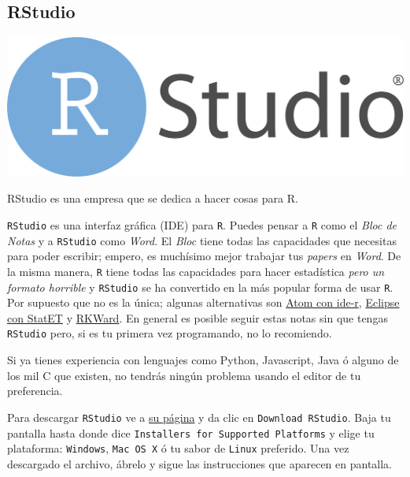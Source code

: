 \documentclass[]{tufte-book}
\begin{document}
\hypertarget{rstudio}{%
\subsection{RStudio}\label{rstudio}}

\begin{marginfigure}
\includegraphics[width=49.08in]{images/rstudio} \caption[RStudio es una empresa que se dedica a hacer cosas para R]{RStudio es una empresa que se dedica a hacer cosas para R.}\label{fig:unnamed-chunk-8}
\end{marginfigure}

\texttt{RStudio} es una interfaz gráfica (IDE) para \texttt{R}. Puedes
pensar a \texttt{R} como el \emph{Bloc de Notas} y a \texttt{RStudio}
como \emph{Word}. El \emph{Bloc} tiene todas las capacidades que
necesitas para poder escribir; empero, es muchísimo mejor trabajar tus
\emph{papers} en \emph{Word}. De la misma manera, \texttt{R} tiene todas
las capacidades para hacer estadística \emph{pero un formato horrible} y
\texttt{RStudio} se ha convertido en la más popular forma de usar
\texttt{R}. Por supuesto que no es la única; algunas alternativas son
\href{https://atom.io/packages/ide-r}{Atom con ide-r},
\href{https://marketplace.eclipse.org/content/statet-r}{Eclipse con
StatET} y \href{https://rkward.kde.org}{RKWard}. En general es posible
seguir estas notas sin que tengas \texttt{RStudio} pero, si es tu
primera vez programando, no lo recomiendo.

\begin{marginfigure}
Si ya tienes experiencia con lenguajes como Python, Javascript, Java ó
alguno de los mil C que existen, no tendrás ningún problema usando el
editor de tu preferencia.
\end{marginfigure}

Para descargar \texttt{RStudio} ve a \href{https://www.rstudio.com}{su
página} y da clic en \texttt{Download\ RStudio}. Baja tu pantalla hasta
donde dice \texttt{Installers\ for\ Supported\ Platforms} y elige tu
plataforma: \texttt{Windows}, \texttt{Mac\ OS\ X} ó tu sabor de
\texttt{Linux} preferido. Una vez descargado el archivo, ábrelo y sigue
las instrucciones que aparecen en pantalla.
\end{document}
